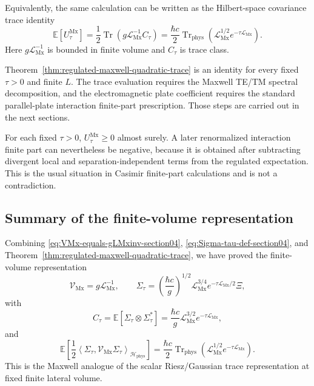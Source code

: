 \documentclass[11pt]{article}
\providecommand{\hbarc}{\hbar c}
\providecommand{\E}{\mathbb{E}}
\providecommand{\Tr}{\operatorname{Tr}}
\providecommand{\Trphys}{\operatorname{Tr}_{\mathrm{phys}}}
\providecommand{\inner}[2]{\left\langle #1,#2\right\rangle}
\providecommand{\paren}[1]{\left(#1\right)}
\providecommand{\Hphys}{\mathcal H_{\mathrm{phys}}}
\providecommand{\LMx}{\mathcal L_{\mathrm{Mx}}}
\providecommand{\VMx}{\mathcal V_{\mathrm{Mx}}}
\providecommand{\XiNoise}{\Xi}
\providecommand{\Sigmatau}{\Sigma_{\tau}}
\providecommand{\Ctau}{C_{\tau}}
\providecommand{\UtauMx}{U_{\tau}^{\mathrm{Mx}}}
\numberwithin{equation}{section}
\begin{document}
Equivalently, the same calculation can be written as the Hilbert-space
covariance trace identity
\begin{equation}
    \E[\UtauMx]
    =
    \frac12\Tr\paren{g\LMx^{-1}\Ctau}
    =
    \frac{\hbarc}{2}\Trphys\paren{\LMx^{1/2}e^{-\tau\LMx}} .
    \label{eq:covariance-trace-identity-Mx}
\end{equation}
Here \(g\LMx^{-1}\) is bounded in finite volume and \(\Ctau\) is trace class.

\begin{remark}
\label{rem:regulated-not-yet-finite-part}
Theorem~\ref{thm:regulated-maxwell-quadratic-trace} is an identity for every
fixed \(\tau>0\) and finite \(L\).  The trace evaluation requires the Maxwell
TE/TM spectral decomposition, and the electromagnetic plate coefficient
requires the standard parallel-plate interaction finite-part prescription.
Those steps are carried out in the next sections.
\end{remark}

\begin{remark}
\label{rem:positive-regulated-negative-fp-Mx}
For each fixed \(\tau>0\), \(\UtauMx\geq0\) almost surely.  A later
renormalized interaction finite part can nevertheless be negative, because it
is obtained after subtracting divergent local and separation-independent terms
from the regulated expectation.  This is the usual situation in Casimir
finite-part calculations and is not a contradiction.
\end{remark}

\subsection{Summary of the finite-volume representation}
\label{subsec:finite-volume-representation-summary}

Combining \eqref{eq:VMx-equals-gLMxinv-section04},
\eqref{eq:Sigma-tau-def-section04}, and
Theorem~\ref{thm:regulated-maxwell-quadratic-trace}, we have proved the
finite-volume representation
\begin{equation}
    \VMx=g\LMx^{-1},
    \qquad
    \Sigmatau
    =
    \paren{\frac{\hbarc}{g}}^{1/2}
    \LMx^{3/4}e^{-\tau\LMx/2}\XiNoise,
    \label{eq:combined-representation-04}
\end{equation}
with
\begin{equation}
    \Ctau
    =
    \E[\Sigmatau\otimes\Sigmatau^*]
    =
    \frac{\hbarc}{g}\LMx^{3/2}e^{-\tau\LMx},
    \label{eq:combined-covariance-04}
\end{equation}
and
\begin{equation}
    \E\left[
        \frac12\inner{\Sigmatau}{\VMx\Sigmatau}_{\Hphys}
    \right]
    =
    \frac{\hbarc}{2}
    \Trphys\paren{\LMx^{1/2}e^{-\tau\LMx}} .
    \label{eq:combined-trace-identity-04}
\end{equation}
This is the Maxwell analogue of the scalar Riesz/Gaussian trace representation
at fixed finite lateral volume.
\end{document}
